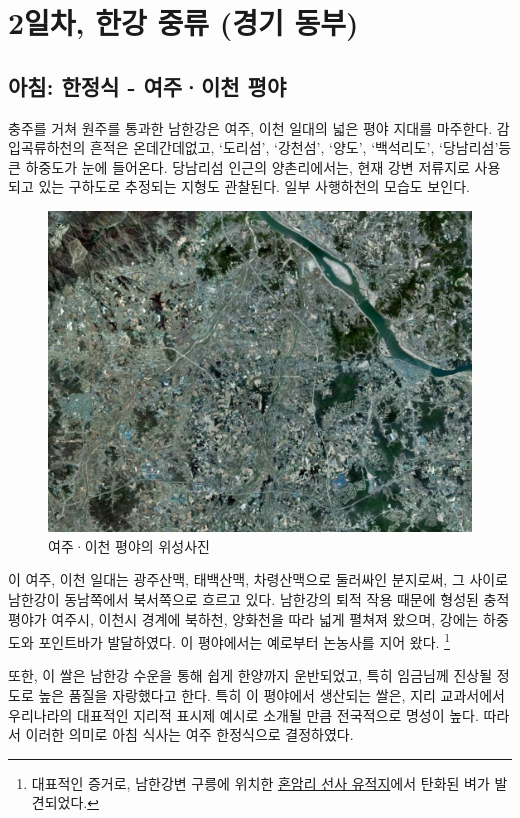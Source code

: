 \chapter{2일차, 한강 중류 (경기 동부)}
\section{아침: 한정식 - 여주·이천 평야}
충주를 거쳐 원주를 통과한 남한강은 여주, 이천 일대의 넓은 평야 지대를 마주한다. 
감입곡류하천의 흔적은 온데간데없고, `도리섬', `강천섬', ‘양도’, ‘백석리도’, `당남리섬'등 큰 하중도가 눈에 들어온다.
당남리섬 인근의 양촌리에서는, 현재 강변 저류지로 사용되고 있는 구하도로 추정되는 지형도 관찰된다.
일부 사행하천의 모습도 보인다.

\begin{figure}[ht]
    \centering
    \includegraphics[width=.6\textwidth]{img/여주이천평야.jpg}
    \caption{여주·이천 평야의 위성사진\protect\footnotemark}
    \label{fig:my_label}
\end{figure}


이 여주, 이천 일대는 
광주산맥, 태백산맥, 차령산맥으로 둘러싸인 분지로써,
그 사이로 남한강이 동남쪽에서 북서쪽으로 흐르고 있다.
남한강의 퇴적 작용 때문에 형성된 충적평야가 여주시, 이천시 경계에 북하천, 양화천을 따라 넓게 펼쳐져 왔으며,
강에는 하중도와 포인트바가 발달하였다.
이 평야에서는 예로부터 논농사를 지어 왔다.
\footnote{대표적인 증거로, 남한강변 구릉에 위치한 \href{https://terms.naver.com/entry.naver?docId=1793906&cid=49217&categoryId=49217}{혼암리 선사 유적지}에서 탄화된 벼가 발견되었다.}


또한, 이 쌀은 남한강 수운을 통해 쉽게 한양까지 운반되었고, 특히 임금님께 진상될 정도로 높은 품질을 자랑했다고 한다.
특히 이 평야에서 생산되는 쌀은, 지리 교과서에서 우리나라의 대표적인 지리적 표시제 예시로 소개될 만큼 전국적으로 명성이 높다.
따라서 이러한 의미로 아침 식사는 여주 한정식으로 결정하였다.
 
